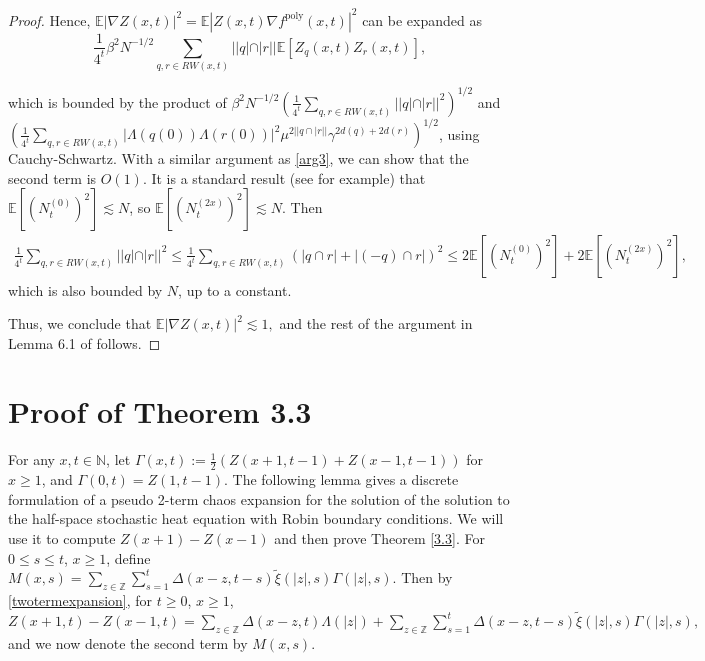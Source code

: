 \documentclass[10pt]{article}
\begin{document}
\begin{proof}
Hence, $\mathbb{E}|\nabla Z(x,t)|^{2} =\mathbb{E}|Z(x,t) \nabla f^{\text{poly}}(x,t)|^{2}$ can be expanded as 
\begin{equation}
    \frac{1}{4^t}\beta^{2}N^{-1/2} \sum_{q, r \in RW(x,t)}||q| \cap |r|| \mathbb{E}[ Z_q(x,t)Z_r(x,t)],
\end{equation} 

which is bounded by the product of $ \beta^{2}N^{-1/2} ( \frac{1}{4^t}\sum_{q, r \in RW(x,t)}||q| \cap |r||^2)^{1/2}$ and \\ $(\frac{1}{4^t}\sum_{q, r \in RW(x,t)} |\Lambda(q(0))\Lambda(r(0))|^2 \mu^{2||q\cap |r||} \gamma^{2d(q)+2d(r)} )^{1/2}$, using Cauchy-Schwartz. With a similar argument as \eqref{arg3}, we can show that the second term is $O(1)$. It is a standard result (see \cite{adhikari2022invariance} for example) that $\mathbb{E}[(N_t^{(0)})^2] \lesssim N$, so $\mathbb{E}[(N_t^{(2x)})^2] \lesssim N$. Then
\begin{equation}
    \begin{aligned}
        \frac{1}{4^t}\sum_{q, r \in RW(x,t)}||q| \cap |r||^2 \leq \frac{1}{4^t}\sum_{q, r \in RW(x,t)}(|q \cap r|+|(-q) \cap r|)^2 \leq 2\mathbb{E}[(N_t^{(0)})^2] +2\mathbb{E}[(N_t^{(2x)})^2],
    \end{aligned}
\end{equation}
which is also bounded by $N$, up to a constant.




Thus, we conclude that $\mathbb{E}|\nabla Z(x,t)|^{2} \lesssim 1,$ and the rest of the argument in Lemma 6.1 of \cite{Chatterjee2021WeakCO} follows.


\end{proof}




\section{Proof of Theorem 3.3}
For any $x, t \in \mathbb{N}$, let
$\Gamma(x, t):=\frac{1}{2}(Z(x+1, t-1)+Z(x-1, t-1))$ for $x\geq 1$, and $\Gamma(0,t)=Z(1,t-1).$ The following lemma gives a discrete formulation of a pseudo 2-term chaos expansion for the solution of the solution to the half-space stochastic heat equation with Robin boundary conditions. We will use it to compute $Z(x+1)-Z(x-1)$ and then prove Theorem \ref{3.3}. For $0 \leq s \leq t$, $x \geq 1$, define $M(x,s)=\sum_{z \in \mathbb{Z}} \sum_{s=1}^{t} \Delta(x-z, t-s) \tilde{\xi}(|z|, s) \Gamma(|z|, s)$. Then by \eqref{twotermexpansion}, for $t\geq 0$, $x \geq 1$,
$Z(x+1, t)-Z(x-1, t)=\sum_{z \in \mathbb{Z}} \Delta(x-z,t)\Lambda(|z|) +\sum_{z \in \mathbb{Z}} \sum_{s=1}^{t} \Delta(x-z, t-s) \tilde{\xi}(|z|, s) \Gamma(|z|, s),$
and we now denote the second term by $M(x,s)$.
\end{document}
